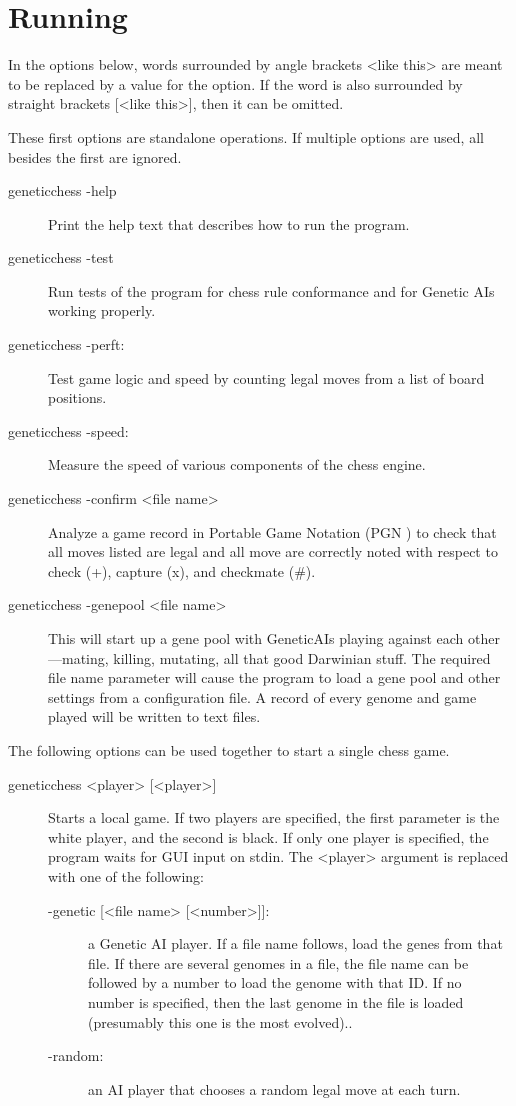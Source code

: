 \documentclass[letterpaper]{article}
\newcommand{\code}[1]{\small\textsf{#1}}
\renewcommand{\_}{\allowbreak\textunderscore\allowbreak}
\begin{document}
\section{Running}\label{running}

In the options below, words surrounded by angle brackets \code{<like this>} are meant to be replaced by a value for the option. If the word is also surrounded by straight brackets \code{[<like this>]}, then it can be omitted.

These first options are standalone operations. If multiple options are used, all besides the first are ignored.
\begin{description}
	\item[\code{genetic\_chess -help}] Print the help text that describes how to run the program.
	\item[\code{genetic\_chess -test}] Run tests of the program for chess rule conformance and for Genetic AIs working properly.
	\item[\code{genetic\_chess -perft}:] Test game logic and speed by counting legal moves from a list of board positions.
	\item[\code{genetic\_chess -speed}:] Measure the speed of various components of the chess engine.
	\item[\code{genetic\_chess -confirm <file name>}] Analyze a game record in Portable Game Notation (PGN \cite{pgn-file-format}) to check that all moves listed are legal and all move are correctly noted with respect to check (+), capture (x), and checkmate (\#).
	\item[\code{genetic\_chess -genepool <file name>}]
This will start up a gene pool with Genetic\_AIs playing against each other---mating, killing, mutating, all that good Darwinian stuff. The required file name parameter will cause the program to load a gene pool and other settings from a configuration file. A record of every genome and game played will be written to text files.
\end{description}
The following options can be used together to start a single chess game.
\begin{description}
	\item[\code{genetic\_chess <player> [<player>]}] Starts a local game. If two players are specified, the first parameter is the white player, and the second is black. If only one player is specified, the program waits for GUI input on stdin. The \code{<player>} argument is replaced with one of the following:
	\begin{description}
		\item[\code{-genetic [<file name> [<number>]]}:] a Genetic AI player. If a file name follows, load the genes from that file. If there are several genomes in a file, the file name can be followed by a number to load the genome with that ID\@. If no number is specified, then the last genome in the file is loaded (presumably this one is the most evolved)..
		\item[\code{-random}:] an AI player that chooses a random legal move at each turn.
	\end{description}
\end{description}
\end{document}
